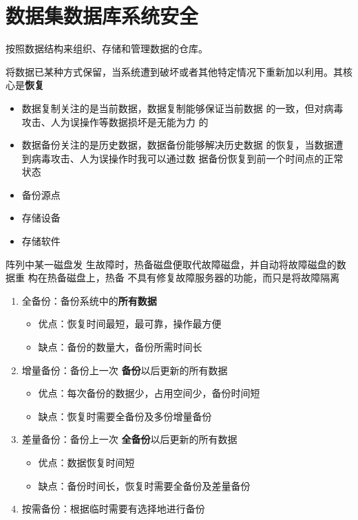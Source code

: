 \chapter{数据集数据库系统安全}
按照数据结构来组织、存储和管理数据的仓库。

将数据已某种方式保留，当系统遭到破坏或者其他特定情况下重新加以利用。其核心是\textbf{恢复}

\begin{itemize}
	\item 数据复制关注的是当前数据，数据复制能够保证当前数据
	的一致，但对病毒攻击、人为误操作等数据损坏是无能为力
	的
	\item 数据备份关注的是历史数据，数据备份能够解决历史数据
	的恢复，当数据遭到病毒攻击、人为误操作时我可以通过数
	据备份恢复到前一个时间点的正常状态
\end{itemize}

\begin{itemize}
	\item 备份源点
	\item 存储设备
	\item 存储软件
\end{itemize}

 阵列中某一磁盘发
生故障时，热备磁盘便取代故障磁盘，并自动将故障磁盘的数据重
构在热备磁盘上，热备
不具有修复故障服务器的功能，而只是将故障隔离

\begin{enumerate}
	\item 全备份：备份系统中的\textbf{所有数据}
	\begin{itemize}
		\item 优点：恢复时间最短，最可靠，操作最方便
		\item  缺点：备份的数量大，备份所需时间长
	\end{itemize}
	\item 增量备份：备份上一次 \textbf{备份}以后更新的所有数据
	\begin{itemize}
		\item 优点：每次备份的数据少，占用空间少，备份时间短
		\item  缺点：恢复时需要全备份及多份增量备份
	\end{itemize}
	\item 差量备份：备份上一次 \textbf{全备份}以后更新的所有数据
	\begin{itemize}
		\item 优点：数据恢复时间短
		\item 缺点：备份时间长，恢复时需要全备份及差量备份
	\end{itemize}
	\item 按需备份：根据临时需要有选择地进行备份
\end{enumerate}

